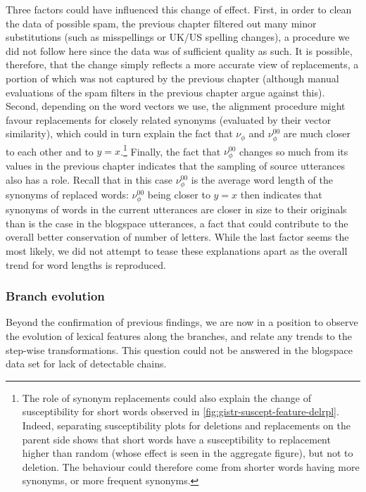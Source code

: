 Three factors could have influenced this change of effect. First, in
order to clean the data of possible spam, the previous chapter filtered
out many minor substitutions (such as misspellings or UK/US spelling
changes), a procedure we did not follow here since the data was of
sufficient quality as such. It is possible, therefore, that the change
simply reflects a more accurate view of replacements, a portion of which
was not captured by the previous chapter (although manual evaluations of
the spam filters in the previous chapter argue against this). Second,
depending on the word vectors we use, the alignment procedure might
favour replacements for closely related synonyms (evaluated by their
vector similarity), which could in turn explain the fact that
\(\nu_{\phi}\) and \(\nu_{\phi}^{00}\) are much closer to each other and
to \(y = x\).\footnote{The role of synonym replacements could also
  explain the change of susceptibility for short words observed in
  \cref{fig:gistr-suscept-feature-delrpl}. Indeed, separating
  susceptibility plots for deletions and replacements on the parent side
  shows that short words have a susceptibility to replacement higher
  than random (whose effect is seen in the aggregate figure), but not to
  deletion. The behaviour could therefore come from shorter words having
  more synonyms, or more frequent synonyms.} Finally, the fact that
\(\nu_{\phi}^{00}\) changes so much from its values in the previous
chapter indicates that the sampling of source utterances also has a
role. Recall that in this case \(\nu_{\phi}^{00}\) is the average word
length of the synonyms of replaced words: \(\nu_{\phi}^{00}\) being
closer to \(y = x\) then indicates that synonyms of words in the current
utterances are closer in size to their originals than is the case in the
blogspace utterances, a fact that could contribute to the overall better
conservation of number of letters. While the last factor seems the most
likely, we did not attempt to tease these explanations apart as the
overall trend for word lengths is reproduced.

\subsubsection{Branch evolution}\label{branch-evolution}

Beyond the confirmation of previous findings, we are now in a position
to observe the evolution of lexical features along the branches, and
relate any trends to the step-wise transformations. This question could
not be answered in the blogspace data set for lack of detectable chains.

